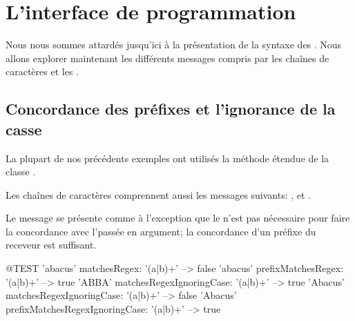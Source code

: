\documentclass[a4paper,10pt,twoside]{book}
\begin{document}
{\section{L'interface de programmation \pkgregex}

Nous nous sommes attardés jusqu'ici à la présentation de la syntaxe
des \expregs. Nous allons explorer maintenant les différents messages
compris par les chaînes de caractères et les \expregs.

\subsection{Concordance des préfixes et l'ignorance de la casse}

La plupart de nos précédents exemples ont utilisés la méthode étendue
 de la classe .

Les chaînes de caractères comprennent aussi les messages suivants:
,  et
.

Le message  se présente comme
 à l'exception que le 
n'est pas nécessaire pour faire la concordance avec l'\expreg passée
en argument; la concordance d'un préfixe du receveur est suffisant.
\begin{code}{@TEST}
'abacus' matchesRegex: '(a|b)+'                                --> false
'abacus' prefixMatchesRegex: '(a|b)+'                       --> true
'ABBA' matchesRegexIgnoringCase: '(a|b)+'            --> true
'Abacus' matchesRegexIgnoringCase: '(a|b)+'          --> false
'Abacus' prefixMatchesRegexIgnoringCase: '(a|b)+' --> true
\end{code}


}
\end{document}
